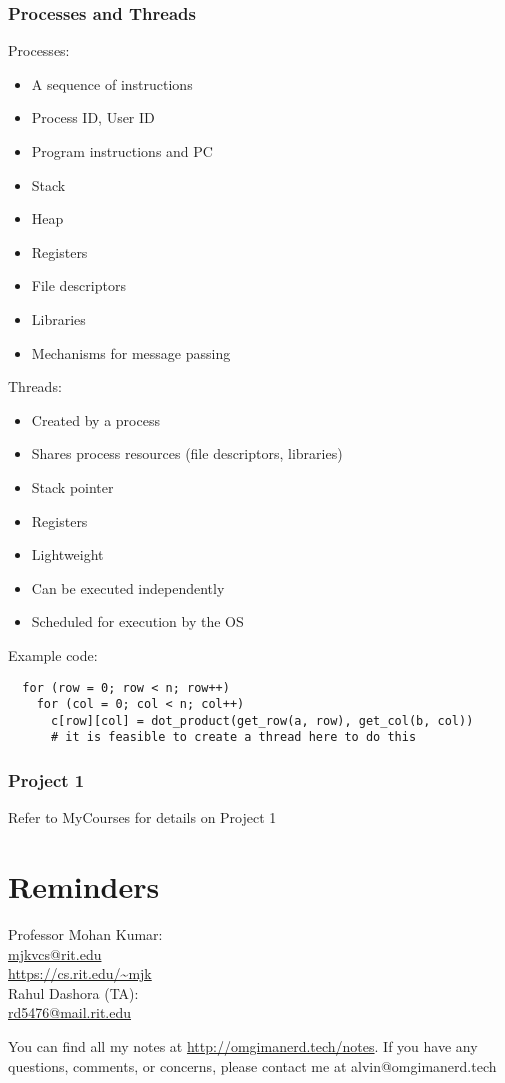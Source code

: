 \documentclass[letterpaper, 12pt]{math}
\begin{document}
\subsubsection*{Processes and Threads}
Processes:
\begin{itemize}
  \item A sequence of instructions
  \item Process ID, User ID
  \item Program instructions and PC
  \item Stack
  \item Heap
  \item Registers
  \item File descriptors
  \item Libraries
  \item Mechanisms for message passing
\end{itemize}
Threads:
\begin{itemize}
  \item Created by a process
  \item Shares process resources (file descriptors, libraries)
  \item Stack pointer
  \item Registers
  \item Lightweight
  \item Can be executed independently
  \item Scheduled for execution by the OS
\end{itemize}
Example code:
\begin{lstlisting}
  for (row = 0; row < n; row++)
    for (col = 0; col < n; col++)
      c[row][col] = dot_product(get_row(a, row), get_col(b, col))
      # it is feasible to create a thread here to do this
\end{lstlisting}

\subsubsection*{Project 1}
Refer to MyCourses for details on Project 1

\section*{Reminders}
Professor Mohan Kumar: \\
\url{mjkvcs@rit.edu} \\
\url{https://cs.rit.edu/~mjk} \\

\noindent Rahul Dashora (TA): \\
\url{rd5476@mail.rit.edu} \\

\begin{center}
  You can find all my notes at \url{http://omgimanerd.tech/notes}. If you have
  any questions, comments, or concerns, please contact me at
  alvin@omgimanerd.tech
\end{center}
\end{document}

